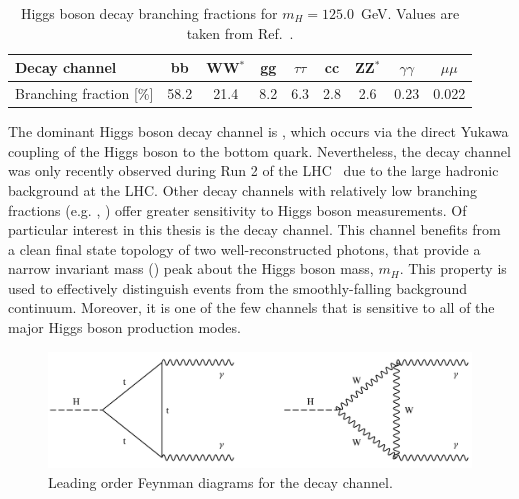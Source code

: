\begin{table}[htb]
    \caption[Higgs boson decay branching fractions]{Higgs boson decay branching fractions for $m_H=125.0$~GeV. Values are taken from Ref.~\cite{deFlorian:2016spz}.}
    \label{tab:higgs_br}
    \centering
    \footnotesize
    \setlength{\tabcolsep}{8pt}
    \renewcommand{\arraystretch}{2}
    \begin{tabular}{l|c|c|c|c|c|c|c|c}
        Decay channel & bb & WW$^{*}$ & gg & $\tau\tau$ & cc & ZZ$^{*}$ & $\gamma\gamma$ & $\mu\mu$   \\ \hline
        Branching fraction [\%] & 58.2 & 21.4 & 8.2 & 6.3 & 2.8 & 2.6 & 0.23 & 0.022  \\
    \end{tabular}
\end{table}

The dominant Higgs boson decay channel is \Hbb, which occurs via the direct Yukawa coupling of the Higgs boson to the bottom quark. Nevertheless, the \Hbb decay channel was only recently observed during Run 2 of the LHC~\cite{Aaboud:2018zhk,Sirunyan:2018kst} due to the large hadronic background at the LHC. Other decay channels with relatively low branching fractions (e.g. \Hfl, \Hgg) offer greater sensitivity to Higgs boson measurements. Of particular interest in this thesis is the \Hgg decay channel. This channel benefits from a clean final state topology of two well-reconstructed photons, that provide a narrow invariant mass (\mgg) peak about the Higgs boson mass, $m_H$. This property is used to effectively distinguish \Hgg events from the smoothly-falling background continuum. Moreover, it is one of the few channels that is sensitive to all of the major Higgs boson production modes.

\begin{figure}[htb!]
  \centering
  \includegraphics[width=.8\linewidth]{Figures/theory/hgg_decay_feynman.png}
  \caption[Leading order Feynman diagrams for the \Hgg decay channel]
  {
    Leading order Feynman diagrams for the \Hgg decay channel.
  }
  \label{fig:hgg_decay}
\end{figure}

